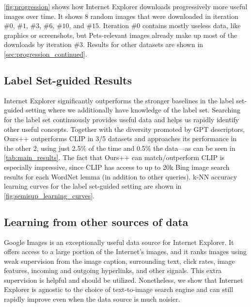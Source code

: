 \cref{fig:progression} shows how Internet Explorer downloads progressively more useful images over time. It shows 8 random images that were downloaded in iteration $\#0$, $\#1$, $\#3$, $\#6$, $\#10$, and $\#15$. Iteration $\#0$ contains mostly useless data, like graphics or screenshots, but Pets-relevant images already make up most of the downloads by iteration $\#3$. 
Results for other datasets are shown in \cref{sec:progression_continued}.

\subsection{Label Set-guided Results}
Internet Explorer significantly outperforms the stronger baselines in the label set-guided setting where we additionally have knowledge of the label set. Searching for the label set continuously provides useful data and helps us rapidly identify other useful concepts. Together with the diversity promoted by GPT descriptors, Ours++ outperforms CLIP in 3/5 datasets and approaches its performance in the other 2, using just 2.5\% of the time and 0.5\% the data---as can be seen in \cref{tab:main_results}. The fact that Ours++ can match/outperform CLIP is especially impressive, since CLIP has access to up to 20k Bing image search results for each WordNet lemma (in addition to other queries).
k-NN accuracy learning curves for the label set-guided setting are shown in \cref{fig:semisup_learning_curves}.


\subsection{Learning from other sources of data}
\label{subsec:search_engine_main}

Google Images is an exceptionally useful data source for Internet Explorer. It offers access to a large portion of the Internet's images, and it ranks images using weak supervision from the image caption, surrounding text, click rates, image features, incoming and outgoing hyperlinks, and other signals. This extra supervision is helpful and should be utilized. Nonetheless, we show that Internet Explorer is agnostic to the choice of text-to-image search engine and can still rapidly improve even when the data source is much noisier. 

